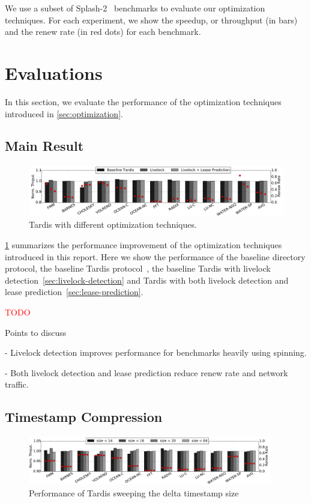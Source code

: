 \documentclass[12pt]{article}
\newcommand{\red}[1]{\textcolor{red}{#1}}
\begin{document}
We use a subset of Splash-2~\cite{splash2} benchmarks to evaluate our 
optimization techniques. For each experiment, we show the speedup, or 
throughput (in bars) and the renew rate (in red dots) for each 
benchmark.

\section{Evaluations}

In this section, we evaluate the performance of the optimization 
techniques introduced in \cref{sec:optimization}.

\subsection{Main Result}

\begin{figure}
	\centering
	\includegraphics[width=0.95\columnwidth]{figs/main.pdf}
	\caption{ Tardis with different optimization techniques.}
	\label{fig:main}
\end{figure}

\cref{fig:main} summarizes the performance improvement of the 
optimization techniques introduced in this report. Here we show the 
performance of the baseline directory protocol, the baseline Tardis 
protocol~\cite{yu2015}, the baseline Tardis with livelock 
detection~\cref{sec:livelock-detection} and Tardis with both livelock 
detection and lease prediction~\cref{sec:lease-prediction}.

\red{TODO}

Points to discuss

- Livelock detection improves performance for benchmarks heavily using 
  spinning.

- Both livelock detection and lease prediction reduce renew rate and 
  network traffic.
  
  


\subsection{Timestamp Compression}

\begin{figure}
	\centering
	\includegraphics[width=0.95\textwidth]{figs/tssize.pdf}
	\caption{ Performance of Tardis sweeping the delta timestamp size}
	\label{fig:tssize}
\end{figure}
\end{document}
